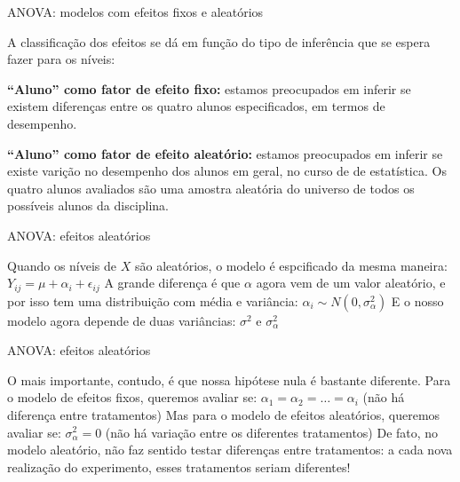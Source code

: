 \documentclass{beamer}\usepackage[]{graphicx}\usepackage[]{color}
\begin{document}
\begin{frame}{ANOVA: modelos com efeitos fixos e aleatórios}

A classificação dos efeitos se dá em função do tipo de inferência que se espera fazer para os níveis: \pause
\vfill

\textbf{``Aluno'' como fator de efeito fixo:} estamos preocupados em inferir se existem diferenças entre os quatro alunos especificados, em termos de desempenho. \pause
\vfill

\textbf{``Aluno'' como fator de efeito aleatório:} estamos preocupados em inferir se existe varição no desempenho dos alunos em geral, no curso de de estatística. Os quatro alunos avaliados são uma amostra aleatória do universo de todos os possíveis alunos da disciplina.
\end{frame}


\begin{frame}{ANOVA: efeitos aleatórios}

Quando os níveis de $X$ são aleatórios, o modelo é espcificado da mesma maneira: 
\vfill
$Y_{ij} = \mu + \alpha_i + \epsilon _{ij}$ \pause
\vfill
A grande diferença é que $\alpha$ agora vem de um valor aleatório, e por isso tem uma distribuição com média e variância:
\vfill
$\alpha _i \sim N(0,\sigma ^2 _\alpha)$ \pause
\vfill
E o nosso modelo agora depende de duas variâncias: $\sigma ^2$ e $\sigma ^2 _\alpha$

\end{frame}


\begin{frame}{ANOVA: efeitos aleatórios}

O mais importante, contudo, é que nossa hipótese nula é bastante diferente. \pause
\vfill
Para o modelo de efeitos fixos, queremos avaliar se:
$\alpha _1 = \alpha _2 = \ldots = \alpha _i$ (não há diferença entre tratamentos) \pause
\vfill
Mas para o modelo de efeitos aleatórios, queremos avaliar se:
\vfill
$\sigma ^2 _\alpha = 0$ (não há variação entre os diferentes tratamentos) \pause
\vfill
De fato, no modelo aleatório, não faz sentido testar diferenças entre tratamentos: a cada nova realização do experimento, esses tratamentos seriam diferentes! 
\end{frame}
\end{document}
